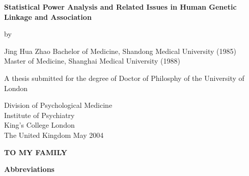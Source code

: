 \documentclass[11pt,a4paper]{iopthsis}
\begin{document}
\thispagestyle{empty}
\vskip 1.5cm
\begin{center}
{
\Large\bf
Statistical Power Analysis and Related Issues
in Human Genetic Linkage and Association
}

\vskip 2cm

{\large by}

\vskip 1cm

{
\Large
Jing Hua Zhao
}
\large\vskip 0.5cm
Bachelor of Medicine, Shandong Medical University (1985)\\
Master of Medicine, Shanghai Medical University (1988)\\

\vskip 1cm

{\large
A thesis submitted for the degree of Doctor of Philosphy of the University of
London}

\vskip 7cm

{
\Large
Division of Psychological Medicine\\
Institute of Psychiatry\\
King's College London\\ \vskip 0.3cm
The United Kingdom
\vskip 1cm
{\large May 2004}
}
\end{center}

\newpage
\topmargin=2in
\thispagestyle{empty}
\begin{center}
{\bf\Large TO MY FAMILY}
\end{center}

\newpage
\topmargin=0in

\renewcommand\contentsname{Table of Contents}
\setcounter{page}{0}
\tableofcontents
\listoftables
\listoffigures
\newpage
\pagestyle{plain}
{\bf\huge Abbreviations}
\end{document}
